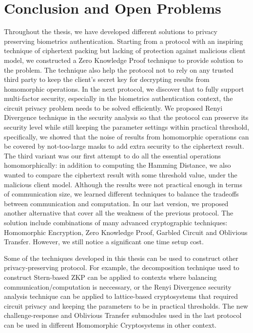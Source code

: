 \chapter{Conclusion and Open Problems}
\label{chap:conclusion}

\ifpdf
    \graphicspath{{Chapter8/Figs/Raster/}{Chapter8/Figs/PDF/}{Chapter8/Figs/}}
\else
    \graphicspath{{Chapter8/Figs/Vector/}{Chapter8/Figs/}}
\fi


Throughout the thesis, we have developed different solutions to privacy
preserving biometrics authentication. Starting from a protocol with an inspiring
technique of ciphertext packing but lacking of protection against malicious
client model, we constructed a Zero Knowledge Proof technique to provide
solution to the problem. The technique also help the protocol not to rely on any
trusted third party to keep the client's secret key for decrypting results from
homomorphic operations. In the next protocol, we discover that to fully support
multi-factor security, especially in the biometrics authentication context, the
circuit privacy problem needs to be solved efficiently. We proposed Renyi
Divergence technique in the security analysis so that the protocol can preserve
its security level while still keeping the parameter settings within practical
threshold, specifically, we showed that the noise of results from homomorphic
operations can be covered by not-too-large masks to add extra security to the
ciphertext result. The third variant was our first attempt to do all the
essential operations homomorphically: in addition to computing the Hamming
Distance, we also wanted to compare the ciphertext result with some threshold
value, under the malicious client model. Although the results were not practical
enough in terms of communication size, we learned different techniques to
balance the tradeoffs between communication and computation. In our last
version, we proposed another alternative that cover all the weakness of the
previous protocol. The solution include combinations of many advanced
cryptographic techniques: Homomorphic Encryption, Zero Knowledge Proof, Garbled
Circuit and Oblivious Transfer. However, we still notice a significant one time
setup cost.

Some of the techniques developed in this thesis can be used to construct other
privacy-preserving protocol. For example, the decomposition technique used to
construct Stern-based ZKP can be applied to contexts where balancing
communication/computation is neccessary, or the Renyi Divergence security
analysis technique can be applied to lattice-based cryptosystems that required
circuit privacy and keeping the parameters to be in practical thresholds. The
new challenge-response and Oblivious Transfer submodules used in the last
protocol can be used in different Homomorphic Cryptosystems in other context.

